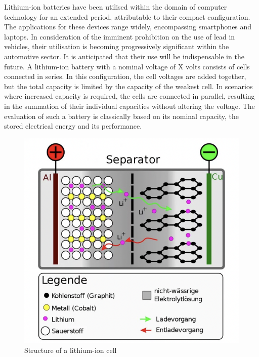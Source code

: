 Lithium-ion batteries have been utilised within the domain of computer technology for an extended period, attributable to their compact configuration. The applications for these devices range widely, encompassing smartphones and laptops. In consideration of the imminent prohibition on the use of lead in vehicles, their utilisation is becoming progressively significant within the automotive sector. It is anticipated that their use will be indispensable in the future.\newline
A lithium-ion battery with a nominal voltage of X volts consists of cells connected in series. In this configuration, the cell voltages are added together, but the total capacity is limited by the capacity of the weakest cell. In scenarios where increased capacity is required, the cells are connected in parallel, resulting in the summation of their individual capacities without altering the voltage. The evaluation of such a battery is classically based on its nominal capacity, the stored electrical energy and its performance.

\begin{figure}[h]
	\centering
	\includegraphics[width=0.7\linewidth]{images/Li-Zelle}
	\caption{Structure of a lithium-ion cell \autocite{scinexx_akku_schattenseiten}}
	\label{fig:li-zelle}
\end{figure}

